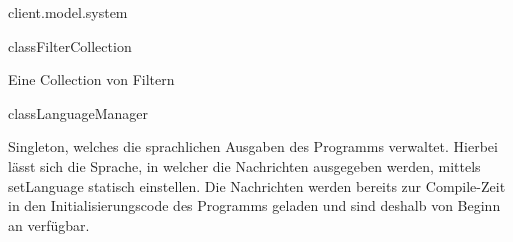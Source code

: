 \begin{texdocpackage}{client.model.system}
\begin{texdocclass}{class}{FilterCollection}
\label{texdoclet:edu.kit.informatik.studyplan.client.model.system.FilterCollection}
\begin{texdocclassintro}
Eine Collection von Filtern\end{texdocclassintro}
\begin{texdocclassfields}
\end{texdocclassfields}
\begin{texdocclassconstructors}
\end{texdocclassconstructors}
\end{texdocclass}


\begin{texdocclass}{class}{LanguageManager}
\label{texdoclet:edu.kit.informatik.studyplan.client.model.system.LanguageManager}
\begin{texdocclassintro}
Singleton, welches die sprachlichen Ausgaben des Programms verwaltet. Hierbei
 lässt sich die Sprache, in welcher die Nachrichten ausgegeben werden, mittels
 setLanguage statisch einstellen. Die Nachrichten werden bereits zur
 Compile-Zeit in den Initialisierungscode des Programms geladen und sind
 deshalb von Beginn an verfügbar.\end{texdocclassintro}
\begin{texdocclassfields}
\end{texdocclassfields}
\begin{texdocclassconstructors}
\end{texdocclassconstructors}
\begin{texdocclassmethods}
\end{texdocclassmethods}
\end{texdocclass}
\end{texdocpackage}
